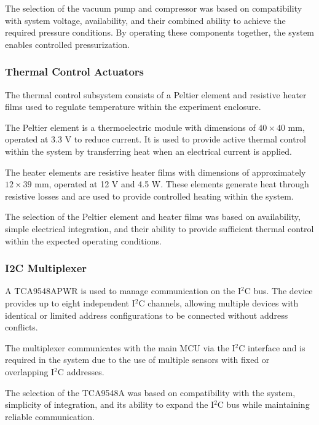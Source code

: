 The selection of the vacuum pump and compressor was based on compatibility with system voltage, availability, and their combined ability to achieve the required pressure conditions. By operating these components together, the system enables controlled pressurization.

\subsubsection{Thermal Control Actuators}

The thermal control subsystem consists of a Peltier element and resistive heater films used to regulate temperature within the experiment enclosure.

The Peltier element is a thermoelectric module with dimensions of $40 \times 40$ mm, operated at 3.3 V to reduce current. It is used to provide active thermal control within the system by transferring heat when an electrical current is applied.

The heater elements are resistive heater films with dimensions of approximately $12 \times 39$ mm, operated at 12 V and 4.5 W. These elements generate heat through resistive losses and are used to provide controlled heating within the system.

The selection of the Peltier element and heater films was based on availability, simple electrical integration, and their ability to provide sufficient thermal control within the expected operating conditions.

\subsubsection{I2C Multiplexer}

A TCA9548APWR is used to manage communication on the I$^2$C bus. The device provides up to eight independent I$^2$C channels, allowing multiple devices with identical or limited address configurations to be connected without address conflicts.

The multiplexer communicates with the main MCU via the I$^2$C interface and is required in the system due to the use of multiple sensors with fixed or overlapping I$^2$C addresses.

The selection of the TCA9548A was based on compatibility with the system, simplicity of integration, and its ability to expand the I$^2$C bus while maintaining reliable communication.


